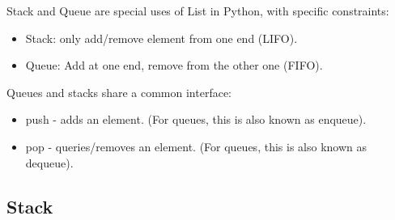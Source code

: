 \begin{tcolorbox}[title=Stack and Queue definition,coltitle =black,fonttitle=\large\bfseries,colback=green!5!white,colframe=green!75!black]
	Stack and Queue are special uses of List in Python, with specific constraints:
	\begin{itemize}
		\item Stack: only add/remove element from one end (LIFO).
		\item Queue: Add at one end, remove from the other one (FIFO).
	\end{itemize}
	Queues and stacks share a common interface:
	\begin{itemize}
		\item push - adds an element. (For queues, this is also known as enqueue).
		\item pop - queries/removes an element. (For queues, this is also known as dequeue).
	\end{itemize}
\end{tcolorbox}

\subsection{Stack}
